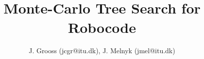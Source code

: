 \documentclass[conference]{IEEEtran}
\begin{document}
\title{\ \\ \LARGE\bf Monte-Carlo Tree Search for Robocode}

\author{J. Grooss (jcgr@itu.dk), J. Melnyk (jmel@itu.dk)}


\maketitle















%



\end{document}

